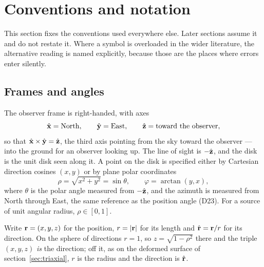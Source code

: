 
\section{Conventions and notation}
\label{sec:conventions}

This section fixes the conventions used everywhere else.  Later sections assume
it and do not restate it.  Where a symbol is overloaded in the wider literature,
the alternative reading is named explicitly, because those are the places where
errors enter silently.

\subsection{Frames and angles}

The observer frame is right-handed, with axes
\begin{equation}
  \hat{\mathbf x} = \text{North}, \qquad
  \hat{\mathbf y} = \text{East}, \qquad
  \hat{\mathbf z} = \text{toward the observer},
  \label{eq:observer-frame}
\end{equation}
so that $\hat{\mathbf x} \times \hat{\mathbf y} = \hat{\mathbf z}$, the third axis pointing from the sky
toward the observer --- into the ground for an observer looking up.  The line of
sight is $-\hat{\mathbf z}$, and the disk is the unit disk seen along it.  A point on the
disk is specified either by Cartesian direction cosines $(x, y)$ or by plane polar
coordinates
\begin{equation}
  \rho = \sqrt{x^2 + y^2} = \sin\theta, \qquad
  \varphi = \arctan(y, x),
  \label{eq:disk-coords}
\end{equation}
where $\theta$ is the polar angle measured from $-\hat{\mathbf z}$, and the
azimuth is measured from North through East, the same reference as the position
angle (D23).  For a source of unit angular radius, $\rho \in [0,1]$.

Write ${\mathbf r} = (x,y,z)$ for the position, $r = |{\mathbf r}|$ for its length and
$\hat{\mathbf r} = {\mathbf r}/r$ for its direction.  On the sphere of directions $r = 1$, so
$z = \sqrt{1-\rho^{2}}$ there and the triple $(x,y,z)$ \emph{is} the direction; off it, as on the
deformed surface of section~\ref{sec:triaxial}, $r$ is the radius and the direction is $\hat{\mathbf r}$.

